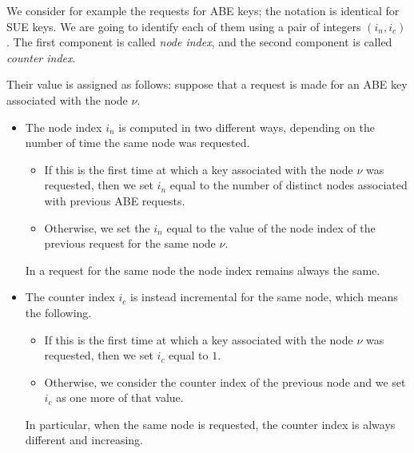 \documentclass[a4paper,10pt]{article}
\begin{document}
	We consider for example the requests for ABE keys; the notation is identical for SUE keys. We are going to identify each of them using a pair of integers $(i_n,i_c)$. The first component is called \emph{node index}, and the second component is called \emph{counter index}.
	
	Their value is assigned as follows: suppose that a request is made for an ABE key associated with the node $\nu$.
	\begin{itemize}
		\item
		The node index $i_n$ is computed in two different ways, depending on the number of time the same node was requested.
		\begin{itemize}
			\item
			If this is the first time at which a key associated with the node $\nu$ was requested, then we set $i_n$ equal to the number of distinct nodes associated with previous ABE requests.
			\item
			Otherwise, we set the $i_n$ equal to the value of the node index of the previous request for the same node $\nu$.
		\end{itemize}
		In a request for the same node the node index remains always the same.
		\item
		The counter index $i_c$ is instead incremental for the same node, which means the following.
		\begin{itemize}
			\item
			If this is the first time at which a key associated with the node $\nu$ was requested, then we set $i_c$ equal to $1$.
			\item
			Otherwise, we consider the counter index of the previous node and we set $i_c$ as one more of that value.
		\end{itemize}
		In particular, when the same node is requested, the counter index is always different and increasing.
	\end{itemize}
	
\end{document}
